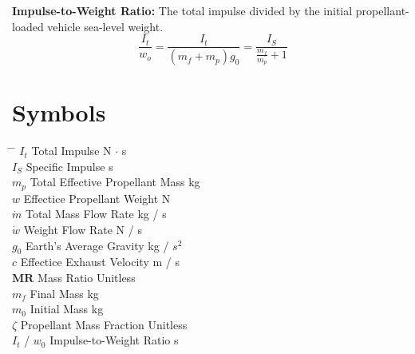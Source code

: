 \documentclass[12pt]{article}
\begin{document}
\bigskip
\noindent
\textbf{Impulse-to-Weight Ratio:}
The total impulse divided by the initial propellant-loaded vehicle sea-level weight.
\begin{equation}
    \frac{I_t}{w_o} = \frac{I_t}{(m_f + m_p) g_0} = \frac{I_S}{\frac{m_f}{m_p} + 1}
\end{equation}



\section*{Symbols}

\begin{tabbing}
\hspace{2cm} \= \hspace{7cm} \= \kill
    $I_t$                  \> Total Impulse                   \> N $\cdot$ s \\
    $I_S$                  \> Specific Impulse                \> s           \\
    $m_p$                  \> Total Effective Propellant Mass \> kg          \\
    $w$                    \> Effectice Propellant Weight     \> N           \\
    $\dot{m}$              \> Total Mass Flow Rate            \> kg / s      \\
    $\dot{w}$              \> Weight Flow Rate                \> N / s       \\
    $g_0$                  \> Earth's Average Gravity         \> kg / $s^2$  \\
    $c$                    \> Effectice Exhaust Velocity      \> m / s       \\
    $\mathbf{M}\mathbf{R}$ \> Mass Ratio                      \> Unitless    \\
    $m_f$                  \> Final Mass                      \> kg          \\
    $m_0$                  \> Initial Mass                    \> kg          \\
    $\zeta$                \> Propellant Mass Fraction        \> Unitless    \\
    $I_t$ / $w_0$          \> Impulse-to-Weight Ratio         \> s           \\
\end{tabbing}
\end{document}
